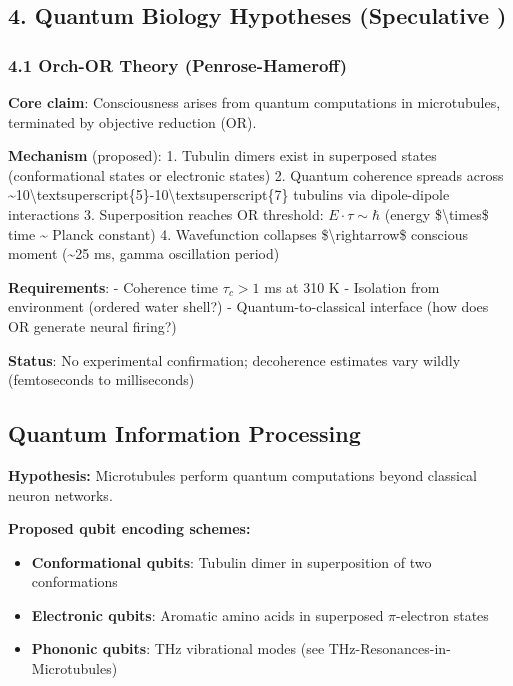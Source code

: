 \subsection{4. Quantum Biology Hypotheses (Speculative
)}\label{quantum-biology-hypotheses-speculative}

\subsubsection{4.1 Orch-OR Theory
(Penrose-Hameroff)}\label{orch-or-theory-penrose-hameroff}

\textbf{Core claim}: Consciousness arises from quantum computations in
microtubules, terminated by objective reduction (OR).

\textbf{Mechanism} (proposed): 1. Tubulin dimers exist in superposed
states (conformational states or electronic states) 2. Quantum coherence
spreads across
\textasciitilde10\textbackslash textsuperscript\{5\}-10\textbackslash textsuperscript\{7\}
tubulins via dipole-dipole interactions 3. Superposition reaches OR
threshold: \(E \cdot \tau \sim \hbar\) (energy \$\textbackslash times\$
time \textasciitilde{} Planck constant) 4. Wavefunction collapses
\$\textbackslash rightarrow\$ conscious moment (\textasciitilde25 ms,
gamma oscillation period)

\textbf{Requirements}: - Coherence time \(\tau_c > 1\) ms at 310 K -
Isolation from environment (ordered water shell?) - Quantum-to-classical
interface (how does OR generate neural firing?)

\textbf{Status}: No experimental confirmation; decoherence estimates
vary wildly (femtoseconds to milliseconds)

\subsection{Quantum Information Processing}

\textbf{Hypothesis:} Microtubules perform quantum computations beyond classical neuron networks.

\textbf{Proposed qubit encoding schemes:}
\begin{itemize}
\item \textbf{Conformational qubits}: Tubulin dimer in superposition of two conformations
\item \textbf{Electronic qubits}: Aromatic amino acids in superposed $\pi$-electron states
\item \textbf{Phononic qubits}: THz vibrational modes (see THz-Resonances-in-Microtubules)
\end{itemize}

